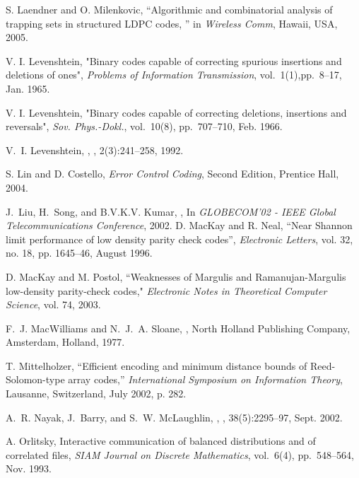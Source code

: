 \begin{thebibliography}{10}
 S. Laendner and O. Milenkovic, ``Algorithmic and
combinatorial analysis of trapping sets in structured LDPC codes, ''
in \emph{Wireless Comm}, Hawaii, USA, 2005.

V. I. Levenshtein, "Binary codes capable of correcting spurious
insertions and deletions of ones", \emph{Problems of Information
Transmission}, vol.\ 1(1),pp.~8--17, Jan. 1965.

V. I. Levenshtein, "Binary codes capable of correcting deletions,
insertions and reversals", \emph{Sov. Phys.-Dokl.}, vol.\ 10(8),
pp.~707--710, Feb. 1966.


V.~I. Levenshtein,
,
, 2(3):241--258, 1992.

S. Lin and D. Costello, \emph{Error Control Coding}, Second Edition,
Prentice Hall, 2004.

J.~Liu, H.~Song, and B.V.K.V. Kumar,
,
\newblock In {\em {GLOBECOM'02 - IEEE Global Telecommunications Conference}},
  2002.
D. MacKay and R. Neal, ``Near Shannon limit performance of low
density parity check codes'', \emph{Electronic Letters}, vol. 32,
no. 18, pp. 1645--46, August 1996.

 D. MacKay and M. Postol, ``Weaknesses of Margulis
and Ramanujan-Margulis low-density parity-check codes,"
\emph{Electronic Notes in Theoretical Computer Science}, vol. 74,
2003.

F.~J. MacWilliams and N.~J.~A. Sloane,
,
\newblock North Holland Publishing Company, Amsterdam, Holland, 1977.


T. Mittelholzer, ``Efficient encoding and minimum distance bounds of
Reed-Solomon-type array codes,'' \emph{International Symposium on
Information Theory}, Lausanne, Switzerland, July 2002, p. 282.

A.~R. Nayak, J.~Barry, and S.~W. McLaughlin,
,
, 38(5):2295--97, Sept. 2002.

A. Orlitsky, Interactive communication of balanced distributions and
of correlated files, \emph{SIAM Journal on Discrete Mathematics},
vol.\ 6(4), pp.~548--564, Nov. 1993.


\end{thebibliography}
